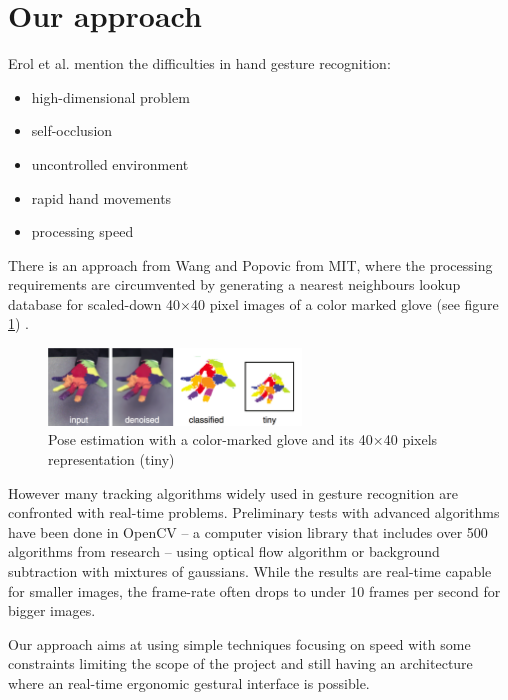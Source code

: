 
\section{Our approach}
\label{sec:our-approach}

Erol et al. \cite{hand-review} mention the difficulties in hand gesture recognition: 
\begin{itemize}
\item high-dimensional problem
\item self-occlusion
\item uncontrolled environment
\item rapid hand movements
\item processing speed
\end{itemize}
There is an approach from Wang and Popovic from MIT, where the processing requirements are circumvented by generating a nearest neighbours lookup database for scaled-down 40$\times$40 pixel images of a color marked glove (see figure \ref{fig:mit}) \cite{mit}.
\begin{figure}[h!]
\center
\includegraphics[width=0.6\textwidth]{images/mit}
\caption{Pose estimation with a color-marked glove and its 40$\times$40 pixels representation (tiny) \cite{mit}}
\label{fig:mit}
\end{figure}

However many tracking algorithms widely used in gesture recognition are confronted with real-time problems. Preliminary tests with advanced algorithms have been done in OpenCV \cite{opencv} -- a computer vision library that includes over 500 algorithms from research -- using optical flow algorithm or background subtraction with mixtures of gaussians. While the results are real-time capable for smaller images, the frame-rate often drops to under 10 frames per second for bigger images.

Our approach aims at using simple techniques focusing on speed with some constraints limiting the scope of the project and still having an architecture where an real-time ergonomic gestural  interface is possible.

